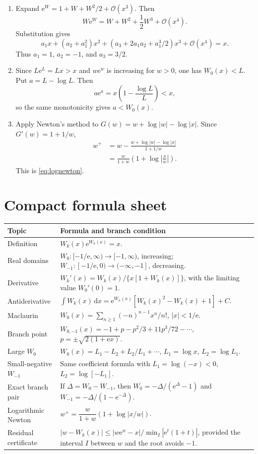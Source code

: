 \documentclass[11pt]{article}
\theoremstyle{remark}
\newcommand{\ee}{\mathrm e}
\newcommand{\bigO}{\mathcal O}
\newcommand{\dd}{\,\mathrm d}
\begin{document}
\begin{enumerate}[label=\textbf{S\arabic*.},leftmargin=*]
\item Expand \(\ee^W=1+W+W^2/2+\bigO(x^3)\).  Then
\[
 W\ee^W=W+W^2+\frac12W^3+\bigO(x^4).
\]
Substitution gives
\[
 a_1x+(a_2+a_1^2)x^2+
 (a_3+2a_1a_2+a_1^3/2)x^3+\bigO(x^4)=x.
\]
Thus \(a_1=1\), \(a_2=-1\), and \(a_3=3/2\).

\item Since \(L\ee^L=Lx>x\) and \(w\ee^w\) is increasing for
\(w>0\), one has \(W_0(x)<L\).  Put \(a=L-\log L\).  Then
\[
       a\ee^a=x\left(1-\frac{\log L}{L}\right)<x,
\]
so the same monotonicity gives \(a<W_0(x)\).

\item Apply Newton's method to
\(G(w)=w+\log|w|-\log|x|\).  Since \(G'(w)=1+1/w\),
\begin{align*}
 w^+&=w-\frac{w+\log|w|-\log|x|}{1+1/w}\\
 &=\frac{w}{1+w}\left(1+\log\left|\frac{x}{w}\right|\right).
\end{align*}
This is \eqref{eq:lognewton}.
\end{enumerate}

\section{Compact formula sheet}\label{app:formula-sheet}

\begin{longtable}{@{}p{}p{}@{}}
\toprule
Topic & Formula and branch condition\\
\midrule
\endhead
Definition & \(W_k(x)\ee^{W_k(x)}=x\).\\
\addlinespace
Real domains & \(W_0:[-1/\ee,\infty)\to[-1,\infty)\), increasing;
\(W_{-1}:[-1/\ee,0)\to(-\infty,-1]\), decreasing.\\
\addlinespace
Derivative & \(W_k'(x)=W_k(x)/\{x[1+W_k(x)]\}\), with the limiting value
\(W_0'(0)=1\).\\
\addlinespace
Antiderivative &
\(\int W_k(x)\dd x=\ee^{W_k(x)}[W_k(x)^2-W_k(x)+1]+C\).\\
\addlinespace
Maclaurin &
\(W_0(x)=\sum_{n\geq1}(-n)^{n-1}x^n/n!\), \(|x|<1/\ee\).\\
\addlinespace
Branch point &
\(W_{0,-1}(x)=-1+p-p^2/3+11p^3/72-\cdots\),
\(p=\pm\sqrt{2(1+\ee x)}\).\\
\addlinespace
Large \(W_0\) &
\(W_0(x)=L_1-L_2+L_2/L_1+\cdots\),
\(L_1=\log x\), \(L_2=\log L_1\).\\
\addlinespace
Small-negative \(W_{-1}\) & Same coefficient formula with
\(L_1=\log(-x)<0\), \(L_2=\log[-L_1]\).\\
\addlinespace
Exact branch pair &
If \(\Delta=W_0-W_{-1}\), then
\(W_0=-\Delta/(\ee^\Delta-1)\) and
\(W_{-1}=-\Delta/(1-\ee^{-\Delta})\).\\
\addlinespace
Logarithmic Newton &
\(w^+=\dfrac{w}{1+w}\left(1+\log\left|x/w\right|\right)\).\\
\addlinespace
Residual certificate &
\(|w-W_k(x)|\leq|w\ee^w-x|/\min_I|\ee^t(1+t)|\), provided the interval
\(I\) between \(w\) and the root avoids \(-1\).\\
\bottomrule
\end{longtable}
\end{document}
